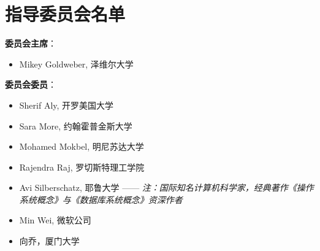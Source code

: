 \section{指导委员会名单}

\textbf{委员会主席}：
\begin{itemize}
    \item Mikey Goldweber, 泽维尔大学
\end{itemize}

\textbf{委员会委员}：
\begin{itemize}
    \item Sherif Aly, 开罗美国大学
    \item Sara More, 约翰霍普金斯大学
    \item Mohamed Mokbel, 明尼苏达大学
    \item Rajendra Raj, 罗切斯特理工学院
    \item Avi Silberschatz, 耶鲁大学 —— \emph{注：国际知名计算机科学家，经典著作《操作系统概念》与《数据库系统概念》资深作者}
    \item Min Wei, 微软公司
    \item 向乔，厦门大学
\end{itemize}

